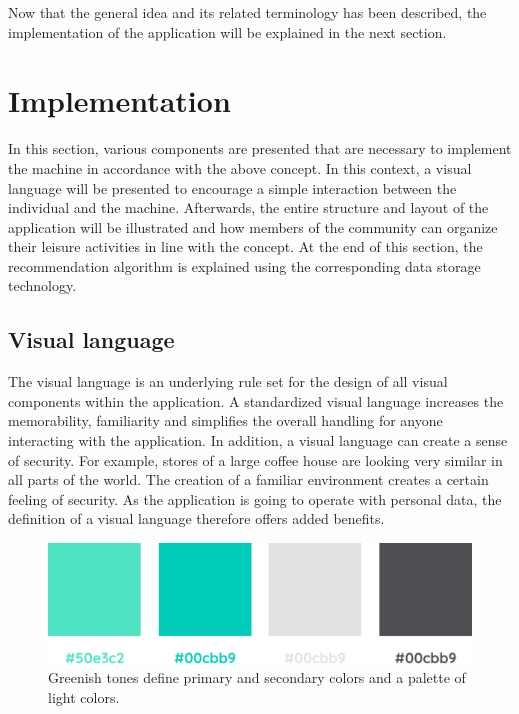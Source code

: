 \documentclass[12pt,numbers=noenddot,parskip,bibliography=totocnumbered,listof=totocnumbered,draft]{scrreprt}
\begin{document}
Now that the general idea and its related terminology has been described, the implementation of the application will be explained in the next section.

\section{Implementation}
In this section, various components are presented that are necessary to implement the machine in accordance with the above concept. In this context, a visual language will be presented to encourage a simple interaction between the individual and the machine. Afterwards, the entire structure and layout of the application will be illustrated and how members of the community can organize their leisure activities in line with the concept. At the end of this section, the recommendation algorithm is explained using the corresponding data storage technology.

\subsection{Visual language}
The visual language is an underlying rule set for the design of all visual components within the application. A standardized visual language increases the memorability, familiarity and simplifies the overall handling for anyone interacting with the application. In addition, a visual language can create a sense of security. For example, stores of a large coffee house are looking very similar in all parts of the world. The creation of a familiar environment creates a certain feeling of security. As the application is going to operate with personal data, the definition of a visual language therefore offers added benefits.

\begin{figure}
\centering
\includegraphics[width=\textwidth]{colors.png}
\caption[Color palette]{Greenish tones define primary and secondary colors and a palette of light colors.}
\label{colors}
\end{figure}
\end{document}
